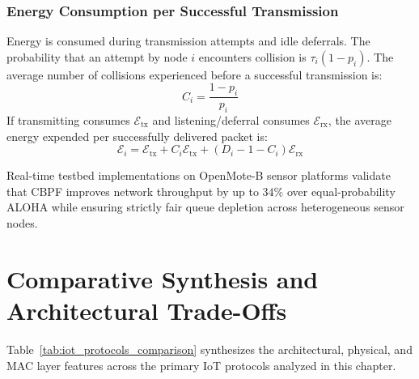 \subsubsection{Energy Consumption per Successful Transmission}
Energy is consumed during transmission attempts and idle deferrals. The probability that an attempt by node $i$ encounters collision is $\tau_i (1 - p_i)$. The average number of collisions experienced before a successful transmission is:
\begin{equation}
    C_i = \frac{1 - p_i}{p_i}
\end{equation}
If transmitting consumes $\mathcal{E}_{\text{tx}}$ and listening/deferral consumes $\mathcal{E}_{\text{rx}}$, the average energy expended per successfully delivered packet is:
\begin{equation}
    \mathcal{E}_i = \mathcal{E}_{\text{tx}} + C_i \mathcal{E}_{\text{tx}} + (D_i - 1 - C_i) \mathcal{E}_{\text{rx}}
\end{equation}

Real-time testbed implementations on OpenMote-B sensor platforms validate that CBPF improves network throughput by up to $34\%$ over equal-probability ALOHA while ensuring strictly fair queue depletion across heterogeneous sensor nodes.



\section{Comparative Synthesis and Architectural Trade-Offs}
\label{sec:iot_comparison}

Table~\ref{tab:iot_protocols_comparison} synthesizes the architectural, physical, and MAC layer features across the primary IoT protocols analyzed in this chapter.

